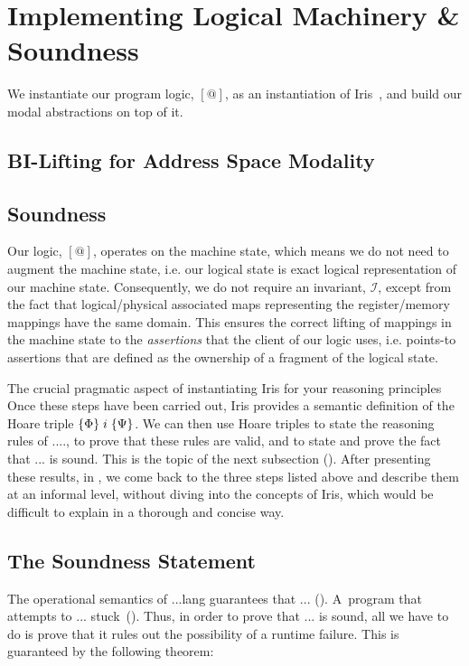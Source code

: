 \section{Implementing Logical Machinery \& Soundness}
We instantiate our program logic, $[@]$, as an instantiation of Iris~\cite{iris}, and build our modal abstractions on top of it. 
\subsection{BI-Lifting for Address Space Modality}
\label{sec:bilifting}
\subsection{Soundness}
\label{sec:soundness}
Our logic, $[@]$, operates on the machine state, which means we do not need to augment the machine state, i.e. our logical state is exact logical representation of our machine state. Consequently, we do not require an invariant, $\mathcal{I}$, except from the fact that logical/physical associated maps representing the register/memory mappings have the same domain. This ensures the correct lifting of mappings in the machine state to the \emph{assertions} that the client of our logic uses, i.e. points-to assertions that are defined as the ownership of a fragment of the logical state.

The crucial pragmatic aspect of instantiating Iris for your reasoning principles  
Once these steps have been carried out, Iris provides a semantic definition of
the Hoare triple $\{\Phi\}\;i\;\{\Psi\}$. We can then use Hoare triples to
state the reasoning rules of ...., to prove that
these rules are valid, and to state and prove the fact that ... is sound.
This is the topic of the next subsection ().
%
After presenting these results, in , we come back to the
three steps listed above and describe them at an informal level, without
diving into the concepts of Iris, which would be difficult to explain in a
thorough and concise way.

\subsection{The Soundness Statement}
\label{def:soundness:statement}

The operational semantics of ...lang guarantees that ... (). A~program that attempts to ... stuck~().
Thus, in order to prove that ... is sound, all we have to do is prove that
it rules out the possibility of a runtime failure. This is guaranteed by the
following theorem:

